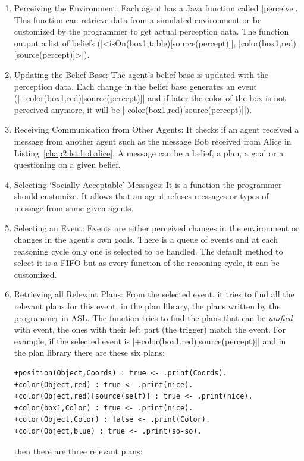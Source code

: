 \documentclass[a4paper,11pt,twoside]{StyleThese}
\begin{document}
\begin{enumerate}
	\item Perceiving the Environment: Each agent has a Java function called |perceive|. This function can retrieve data from a simulated environment or be customized by the programmer to get actual perception data. The function output a list of beliefs (\eg |<isOn(box1,table)[source(percept)]|, |color(box1,red)[source(percept)]>|).
	\item Updating the Belief Base: The agent's belief base is updated with the perception data. Each change in the belief base generates an event (\eg |+color(box1,red)[source(percept)]| and if later the color of the box is not perceived anymore, it will be |-color(box1,red)[source(percept)]|).\label{chap2:list:update_bb}
	\item Receiving Communication from Other Agents: It checks if an agent received a message from another agent such as the message Bob received from Alice in Listing~\ref{chap2:lst:bobalice}. A message can be a belief, a plan, a goal or a questioning on a given belief.
	\item Selecting ‘Socially Acceptable’ Messages: It is a function the programmer should customize. It allows that an agent refuses messages or types of message from some given agents.
	\item Selecting an Event: Events are either perceived changes in the environment or changes in the agent's own goals. There is a queue of events and at each reasoning cycle only one is selected to be handled. The default method to select it is a FIFO but as every function of the reasoning cycle, it can be customized. 
	\item Retrieving all Relevant Plans: From the selected event, it tries to find all the relevant plans for this event, in the plan library, \ie the plans written by the programmer in ASL. The function tries to find the plans that can be \textit{unified} with event, \ie the ones with their left part (the trigger) match the event. For example, if the selected event is |+color(box1,red)[source(percept)]| and in the plan library there are these six plans:
\begin{lstlisting}[style=inline]
+position(Object,Coords) : true <- .print(Coords).
+color(Object,red) : true <- .print(nice).
+color(Object,red)[source(self)] : true <- .print(nice).
+color(box1,Color) : true <- .print(nice).
+color(Object,Color) : false <- .print(Color).
+color(Object,blue) : true <- .print(so-so).
\end{lstlisting}
	then there are three relevant plans:

\end{enumerate}
\end{document}
